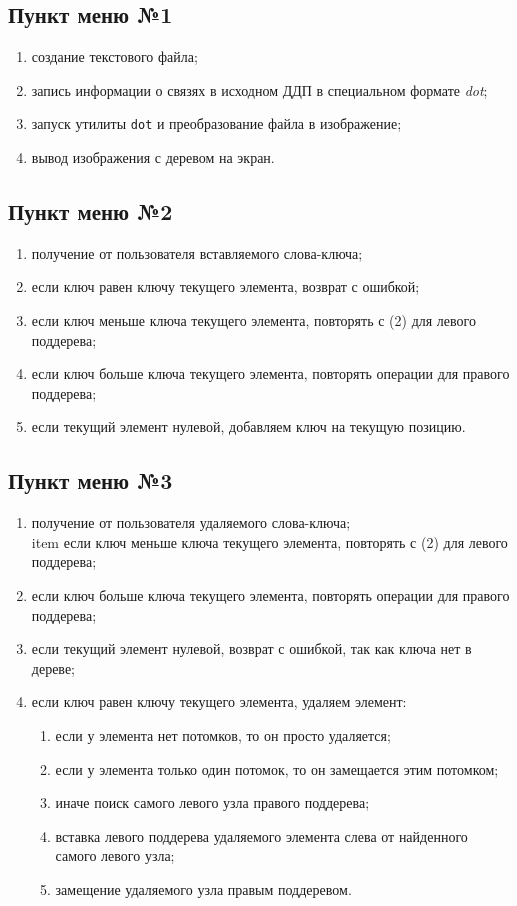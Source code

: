 \documentclass[a4paper,12pt]{extarticle}
\begin{document}
\subsection{Пункт меню №1}
\begin{enumerate}
    \item создание текстового файла;
    \item запись информации о связях в исходном ДДП в специальном формате \textit{dot};
    \item запуск утилиты \texttt{dot} и преобразование файла в изображение;
    \item вывод изображения с деревом на экран.
\end{enumerate}

\subsection{Пункт меню №2}
\begin{enumerate}
	\item получение от пользователя вставляемого слова-ключа;
   	\item если ключ равен ключу текущего элемента, возврат с ошибкой;
   	\item если ключ меньше ключа текущего элемента, повторять с (2) для левого поддерева;
   	\item если ключ больше ключа текущего элемента, повторять операции для правого поддерева;
   	\item если текущий элемент нулевой, добавляем ключ на текущую позицию.
\end{enumerate}

\subsection{Пункт меню №3}
\begin{enumerate}
    \item получение от пользователя удаляемого слова-ключа;
    \\item если ключ меньше ключа текущего элемента, повторять с (2) для левого поддерева;
   	\item если ключ больше ключа текущего элемента, повторять операции для правого поддерева;
   	\item если текущий элемент нулевой, возврат с ошибкой, так как ключа нет в дереве;
   	\item если ключ равен ключу текущего элемента, удаляем элемент:
   	\begin{enumerate}
   		\item если у элемента нет потомков, то он просто удаляется;
   		\item если у элемента только один потомок, то он замещается этим потомком;
   		\item иначе поиск самого левого узла правого поддерева;
   		\item вставка левого поддерева удаляемого элемента слева от найденного самого левого узла;
   		\item замещение удаляемого узла правым поддеревом.
   	\end{enumerate}
\end{enumerate}
\end{document}
